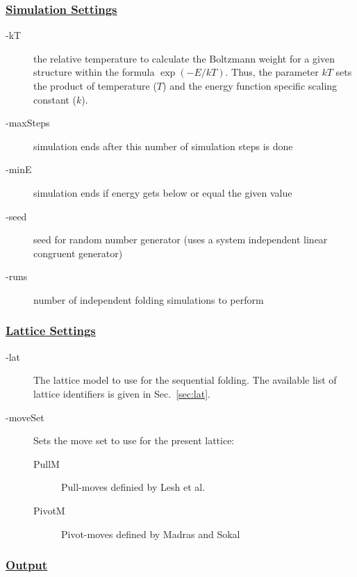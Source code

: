 \documentclass{article}
\begin{document}
\subsubsection*{\underline{ Simulation Settings }} 

\begin{description}
	\item[-kT] the relative temperature to calculate the Boltzmann weight for a
	given structure within the formula $\exp(-E/kT)$. Thus, the parameter $kT$ 
	sets the product of temperature ($T$) and the energy function specific scaling
	constant ($k$).
	\item[-maxSteps] simulation ends after this number of simulation steps is done
 	\item[-minE] simulation ends if energy gets below or equal the given value
 	\item[-seed] seed for random number generator (uses a system
        independent linear congruent generator)
 	\item[-runs] number of independent folding simulations to perform
\end{description}

\subsubsection*{\underline{ Lattice Settings }} \label{sec:lat-params}

\begin{description}
	\item[-lat] The lattice model to use for the sequential folding. The
	available list of lattice identifiers is given in Sec.~\ref{sec:lat}.
	\item[-moveSet] Sets the move set to use for the present lattice:
	\begin{description}
    	\item[PullM] Pull-moves definied by Lesh et al. \cite{Lesh:RECOMB2003}
    	\item[PivotM] Pivot-moves defined by Madras and Sokal
    	\cite{Madras:Sokal:JSP88}
    \end{description} 
\end{description}



\subsubsection*{\underline{ Output }}
\end{document}
